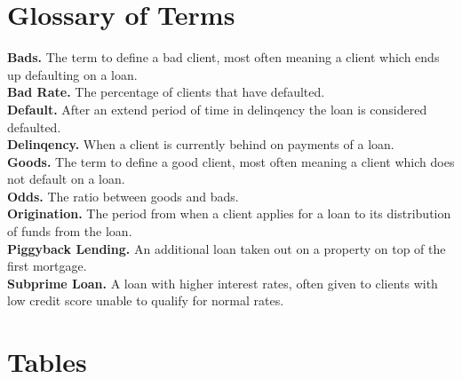 \begin{appendices}
\chapter{Glossary of Terms}\label{sec:glossary}

\textbf{Bads.} The term to define a bad client, most often meaning a client which ends up defaulting on a loan.\\

\noindent \textbf{Bad Rate.} The percentage of clients that have defaulted.\\

\noindent \textbf{Default.} After an extend period of time in delinqency the loan is considered defaulted.\\

\noindent \textbf{Delinqency.} When a client is currently behind on payments of a loan.\\

\noindent \textbf{Goods.} The term to define a good client, most often meaning a client which does not default on a loan.\\

\noindent \textbf{Odds.} The ratio between goods and bads.\\

\noindent \textbf{Origination.} The period from when a client applies for a loan to its distribution of funds from the loan.\\

\noindent \textbf{Piggyback Lending.} An additional loan taken out on a property on top of the first mortgage.\\

\noindent \textbf{Subprime Loan.} A loan with higher interest rates, often given to clients with low credit score unable to qualify for normal rates. \\


\chapter{Tables}


\end{appendices}
